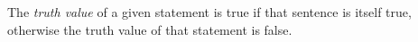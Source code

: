 \guard



\begin{defn}
\label{defn:statementTruthValue}
  The \emph{truth value} of a given statement is true if that sentence is itself true, otherwise the truth value of that statement is false.
\end{defn}

